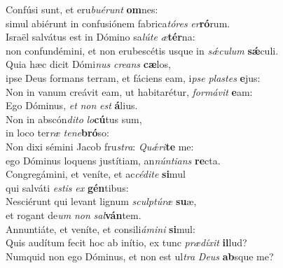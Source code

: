 \evenverse Confúsi sunt, et eru\textit{bu}\textit{é}\textit{runt} \textbf{om}nes:~\*\\
\evenverse simul abiérunt in confusiónem fabrica\textit{tó}\textit{res} \textit{er}\textbf{ró}rum.\\
\oddverse Israël salvátus est in Dómino sa\textit{lú}\textit{te} \textit{æ}\textbf{tér}na:~\*\\
\oddverse non confundémini, et non erubescétis usque in \textit{sǽ}\textit{cu}\textit{lum} \textbf{sǽ}culi.\\
\evenverse Quia hæc dicit Dómi\textit{nus} \textit{cre}\textit{ans} \textbf{cæ}los,~\*\\
\evenverse ipse Deus formans terram, et fáciens eam, i\textit{pse} \textit{pla}\textit{stes} \textbf{e}jus:\\
\oddverse Non in vanum creávit eam, ut habitarétur, \textit{for}\textit{má}\textit{vit} \textbf{e}am:~\*\\
\oddverse Ego Dóminus, \textit{et} \textit{non} \textit{est} \textbf{á}lius.\\
\evenverse Non in abscón\textit{di}\textit{to} \textit{lo}\textbf{cú}tus sum,~\*\\
\evenverse in loco ter\textit{ræ} \textit{te}\textit{ne}\textbf{bró}so:\\
\oddverse Non dixi sémini Jacob fru\textit{stra}: \textit{Quǽ}\textit{ri}\textbf{te} me:~\*\\
\oddverse ego Dóminus loquens justítiam, an\textit{nún}\textit{ti}\textit{ans} \textbf{re}cta.\\
\evenverse Congregámini, et veníte, et ac\textit{cé}\textit{di}\textit{te} \textbf{si}mul~\*\\
\evenverse qui salváti \textit{e}\textit{stis} \textit{ex} \textbf{gén}tibus:\\
\oddverse Nesciérunt qui levant lignum \textit{scul}\textit{ptú}\textit{ræ} \textbf{su}æ,~\*\\
\oddverse et rogant de\textit{um} \textit{non} \textit{sal}\textbf{ván}tem.\\
\evenverse Annuntiáte, et veníte, et consili\textit{á}\textit{mi}\textit{ni} \textbf{si}mul:~\*\\
\evenverse Quis audítum fecit hoc ab inítio, ex tunc \textit{præ}\textit{dí}\textit{xit} \textbf{il}lud?\\
\oddverse Numquid non ego Dóminus, et non est ul\textit{tra} \textit{De}\textit{us} \textbf{ab}sque me?~\*\\
